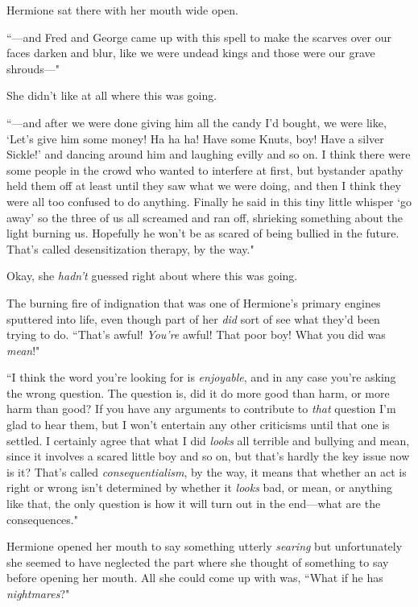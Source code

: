 Hermione sat there with her mouth wide open.

``—and Fred and George came up with this spell to make the scarves over our faces darken and blur, like we were undead kings and those were our grave shrouds—"

She didn't like at all where this was going.

``—and after we were done giving him all the candy I'd bought, we were like, `Let's give him some money! Ha ha ha! Have some Knuts, boy! Have a silver Sickle!' and dancing around him and laughing evilly and so on. I think there were some people in the crowd who wanted to interfere at first, but bystander apathy held them off at least until they saw what we were doing, and then I think they were all too confused to do anything. Finally he said in this tiny little whisper `go away' so the three of us all screamed and ran off, shrieking something about the light burning us. Hopefully he won't be as scared of being bullied in the future. That's called desensitization therapy, by the way."

Okay, she \emph{hadn't} guessed right about where this was going.

The burning fire of indignation that was one of Hermione's primary engines sputtered into life, even though part of her \emph{did} sort of see what they'd been trying to do. ``That's awful! \emph{You're} awful! That poor boy! What you did was \emph{mean}!"

``I think the word you're looking for is \emph{enjoyable}, and in any case you're asking the wrong question. The question is, did it do more good than harm, or more harm than good? If you have any arguments to contribute to \emph{that} question I'm glad to hear them, but I won't entertain any other criticisms until that one is settled. I certainly agree that what I did \emph{looks} all terrible and bullying and mean, since it involves a scared little boy and so on, but that's hardly the key issue now is it? That's called \emph{consequentialism}, by the way, it means that whether an act is right or wrong isn't determined by whether it \emph{looks} bad, or mean, or anything like that, the only question is how it will turn out in the end—what are the consequences."

Hermione opened her mouth to say something utterly \emph{searing} but unfortunately she seemed to have neglected the part where she thought of something to say before opening her mouth. All she could come up with was, ``What if he has \emph{nightmares}?"

